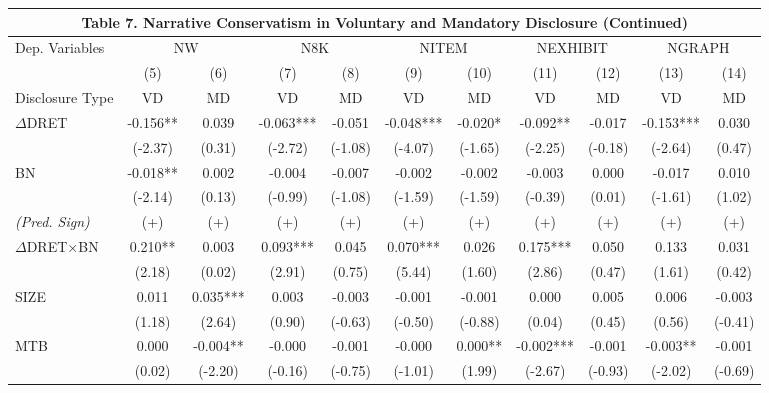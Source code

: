 \begin{table}[H]
	\begin{center}
		\tabcolsep=0.11cm
		\begin{tabular}{lcccccccccc}
			\multicolumn{11}{c}{\textbf{Table 7. Narrative Conservatism in Voluntary and Mandatory Disclosure (Continued)}} \\
			\toprule
			\toprule
			Dep. Variables & \multicolumn{2}{c}{NW} & \multicolumn{2}{c}{N8K} & \multicolumn{2}{c}{NITEM} & \multicolumn{2}{c}{NEXHIBIT} & \multicolumn{2}{c}{NGRAPH} \\
			\cmidrule{2-11}
			& (5) & (6) & (7) & (8) & (9) & (10) & (11) & (12) & (13) & (14) \\
			Disclosure Type & VD & MD & VD & MD & VD & MD & VD & MD & VD & MD \\
			\midrule
			$\Delta$DRET & -0.156** & 0.039 & -0.063*** & -0.051 & -0.048*** & -0.020* & -0.092** & -0.017 & -0.153*** & 0.030 \\
			& (-2.37) & (0.31) & (-2.72) & (-1.08) & (-4.07) & (-1.65) & (-2.25) & (-0.18) & (-2.64) & (0.47) \\
			BN & -0.018** & 0.002 & -0.004 & -0.007 & -0.002 & -0.002 & -0.003 & 0.000 & -0.017 & 0.010 \\
			& (-2.14) & (0.13) & (-0.99) & (-1.08) & (-1.59) & (-1.59) & (-0.39) & (0.01) & (-1.61) & (1.02) \\
			\rowcolor[rgb]{ .906,  .902,  .902} \textit{(Pred. Sign)} & (+) & (+) & (+) & (+) & (+) & (+) & (+) & (+) & (+) & (+) \\
			\rowcolor[rgb]{ .906,  .902,  .902} $\Delta$DRET$\times$BN & 0.210** & 0.003 & 0.093*** & 0.045 & 0.070*** & 0.026 & 0.175*** & 0.050 & 0.133 & 0.031 \\
			\rowcolor[rgb]{ .906,  .902,  .902} & (2.18) & (0.02) & (2.91) & (0.75) & (5.44) & (1.60) & (2.86) & (0.47) & (1.61) & (0.42) \\
			SIZE & 0.011 & 0.035*** & 0.003 & -0.003 & -0.001 & -0.001 & 0.000 & 0.005 & 0.006 & -0.003 \\
			& (1.18) & (2.64) & (0.90) & (-0.63) & (-0.50) & (-0.88) & (0.04) & (0.45) & (0.56) & (-0.41) \\
			MTB & 0.000 & -0.004** & -0.000 & -0.001 & -0.000 & 0.000** & -0.002*** & -0.001 & -0.003** & -0.001 \\
			& (0.02) & (-2.20) & (-0.16) & (-0.75) & (-1.01) & (1.99) & (-2.67) & (-0.93) & (-2.02) & (-0.69) \\

\end{tabular}
\end{center}
\end{table}
